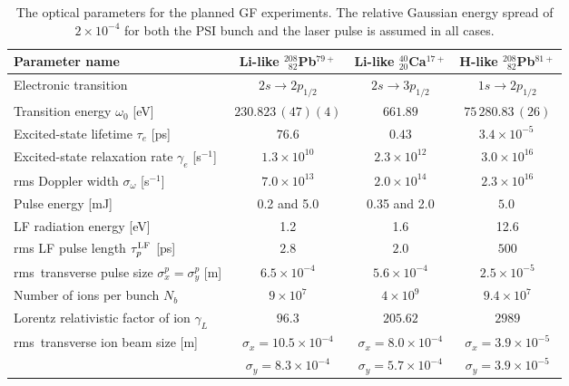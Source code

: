 \begin{table*}[!htbp]
    \caption{The optical parameters for the planned GF experiments. 
    The relative Gaussian energy spread of $2\times 10^{-4}$ for both the PSI bunch and the laser pulse is assumed 
    in all cases.}
    \centering
    \begin{threeparttable}
    \begin{tabular}{l|c|c|c}
    \hline\hline
    Parameter name & 
    Li-like ${}^{208}_{\phantom{0}82}$Pb$^{79+}$ & 
    Li-like ${}^{40}_{20}$Ca$^{17+}$ & 
    H-like ${}^{208}_{\phantom{0}82}$Pb$^{81+}$ \\
         \hline
         {Electronic transition} & $2s\rightarrow 2p_{1/2}$ &  $2s\rightarrow 3p_{1/2}$ & $1s\rightarrow 2p_{1/2}$ \\
         {Transition energy $\omega_0$ [eV]} & $230.823\,(47)(4) $ \cite{YerokhinSurzhykov:2018a,YerokhinSurzhykov:2018b} & $661.89$ \cite{NIST-ASD} & $75\,280.83\,(26)$ \cite{YerokhinShabaev:2015} \\
         {Excited-state lifetime $\tau_e$ [ps]} & $76.6$ \cite{JohnsonLiuSapirstein:1996} & $0.43$\tnote{(a)} & $3.4\times 10^{-5}\,$\tnote{(a)}  \\
         Excited-state relaxation rate $\gamma_e$ [s$^{-1}$] & $1.3\times 10^{10}$ & $2.3\times 10^{12}$& $3.0\times 10^{16}$ \\
         rms Doppler width $\sigma_\omega$ [s$^{-1}$] & $7.0\times 10^{13}$ & $2.0\times 10^{14}$ & $2.3\times 10^{16}$\\ \hline
         Pulse energy [mJ] & 0.2 and 5.0 & 0.35 and 2.0 & $5.0\,$\tnote{(b)} \\
         LF radiation energy [eV] & 1.2 & 1.6 & 12.6\\
         rms LF pulse length $\tau_p^{\rm LF}$ [ps] & $2.8$ & $2.0$& $500$  \\
         rms\ transverse pulse size $\sigma^p_x=\sigma^p_y$ [m] & $6.5\times 10^{-4}$ & $5.6\times 10^{-4}$ & $2.5\times 10^{-5}$  \\ \hline
         Number of ions per bunch $N_b$ & $9\times 10^7$ & $4\times 10^9$& $9.4\times 10^7$\\
Lorentz relativistic factor of ion $\gamma_L$ & $96.3$ & $205.62$ & $2989$ \\
         rms\ transverse ion beam size [m] & $\sigma_x = 10.5 \times 10^{-4}$ & $\sigma_x=8.0 \times 10^{-4}$ & $\sigma_x = 3.9\times 10^{-5}$ \\
          & $\sigma_y=8.3 \times 10^{-4}$ &  $\sigma_y=5.7 \times 10^{-4}$ & $\sigma_y = 3.9\times 10^{-5}$ \\

\end{tabular}
\end{threeparttable}
\end{table*}
